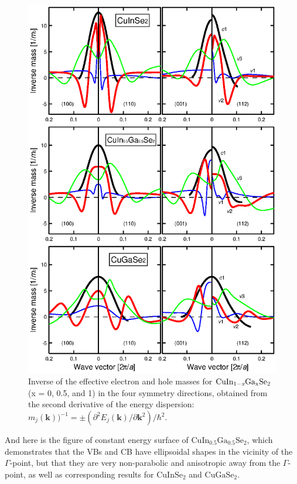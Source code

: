 \documentclass[a4paper, 12pt, titlepage,oneside,drop]{kthesis}
\begin{document}
\begin{figure}[H]
\begin{center}
\includegraphics[scale=.6]{paper1figure3.eps} 
\end{center}
\caption{Inverse of the effective electron and hole masses for $\mathrm { CuIn_{1-\textit{x}}Ga_{x}Se_2}$ (x = 0, 0.5, and 1) in the four symmetry directions, obtained from the second derivative of the energy dispersion:
 $m_j(\textbf{k}))^{-1} = \pm (\partial^2 E_j(\textbf{k})/{\partial{\textbf{k}}^2})/\hbar^2. $ }
\end{figure}

And here is the figure of constant energy surface of $\mathrm {CuIn_{0.5}Ga_{0.5}Se_2}$, which demonstrates that the VBs and CB have ellipsoidal shapes in the vicinity of the $\Gamma$-point,
but that they are very non-parabolic and anisotropic away from the $\Gamma$-point, as well as corresponding results for $\mathrm {CuInSe_2}$ and $\mathrm {CuGaSe_2}$.
  
\end{document}

